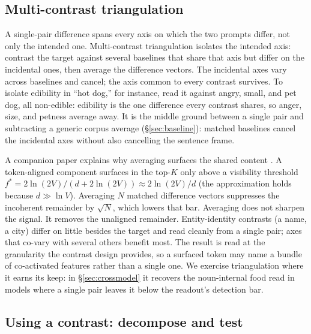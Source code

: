 \documentclass[11pt]{article}
\begin{document}
\subsection{Multi-contrast triangulation}
\label{sec:triangulation}

A single-pair difference spans every axis on which the two prompts differ, not
only the intended one. Multi-contrast triangulation isolates the intended axis:
contrast the target against several baselines that share that axis but differ on
the incidental ones, then average the difference vectors. The incidental axes
vary across baselines and cancel; the axis common to every contrast survives. To
isolate edibility in ``hot dog,'' for instance, read it against angry, small,
and pet dog, all non-edible: edibility is the one difference every contrast
shares, so anger, size, and petness average away. It is the middle ground
between a single pair and subtracting a generic corpus average
(\S\ref{sec:baseline}): matched baselines cancel the incidental axes without
also cancelling the sentence frame.

A companion paper explains why averaging surfaces the shared content
\citep{tuomi2026visibility}. A token-aligned component surfaces in the top-$K$
only above a visibility threshold $f^{*} = 2\ln(2V)/(d + 2\ln(2V)) \approx
2\ln(2V)/d$ (the approximation holds because $d \gg \ln V$). Averaging $N$
matched difference vectors suppresses the incoherent remainder by $\sqrt{N}$,
which lowers that bar. Averaging does not sharpen the signal. It removes the
unaligned remainder. Entity-identity contrasts (a name, a city) differ on little
besides the target and read cleanly from a single pair; axes that co-vary with
several others benefit most. The result is read at the granularity the contrast
design provides, so a surfaced token may name a bundle of co-activated features
rather than a single one. We exercise triangulation where it earns its keep: in
\S\ref{sec:crossmodel} it recovers the noun-internal food read in models where a
single pair leaves it below the readout's detection bar.

\subsection{Using a contrast: decompose and test}
\label{sec:decompose}
\end{document}
